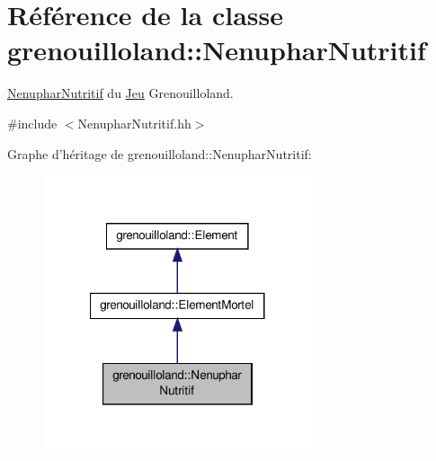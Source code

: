 \hypertarget{classgrenouilloland_1_1NenupharNutritif}{\section{Référence de la classe grenouilloland\-:\-:Nenuphar\-Nutritif}
\label{classgrenouilloland_1_1NenupharNutritif}
}


\hyperlink{classgrenouilloland_1_1NenupharNutritif}{Nenuphar\-Nutritif} du \hyperlink{classgrenouilloland_1_1Jeu}{Jeu} Grenouilloland.  




{\ttfamily \#include $<$Nenuphar\-Nutritif.\-hh$>$}



Graphe d'héritage de grenouilloland\-:\-:Nenuphar\-Nutritif\-:
\nopagebreak
\begin{figure}[H]
\begin{center}
\leavevmode
\includegraphics[width=224pt]{classgrenouilloland_1_1NenupharNutritif__inherit__graph}
\end{center}
\end{figure}


